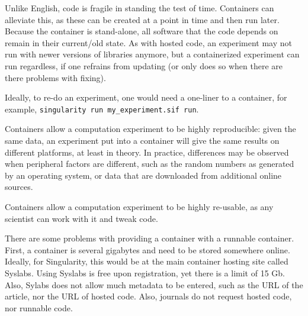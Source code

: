 
Unlike English, code is fragile in standing the test of time.
Containers can alleviate this, as these can be created at a point
in time and then run later. Because the container is stand-alone,
all software that the code depends on remain in their current/old state.
As with hosted code, an experiment may not run with newer versions
of libraries anymore, but a containerized experiment can run regardless, 
if one refrains from updating (or only does so when there are there problems with fixing).

Ideally, to re-do an experiment, one would need a one-liner to a container,
for example, \verb|singularity run my_experiment.sif run|.


Containers allow a computation experiment to be highly reproducible:
given the same data, an experiment put into a container will give
the same results on different platforms, at least in theory.
In practice, differences may be observed when peripheral factors
are different, such as the random numbers as generated by an operating
system, or data that are downloaded from additional online sources.


Containers allow a computation experiment to be highly re-usable,
as any scientist can work with it and tweak code.


There are some problems with providing a container with a runnable container.
First, a container is several gigabytes and need to be stored somewhere
online. 
Ideally, for Singularity, this would be at the main container hosting
site called Syslabs. Using Syslabs is free upon registration, 
yet there is a limit of 15 Gb. Also, Sylabs does not allow much metadata to
be entered, such as the URL of the article, nor the URL of hosted code.
Also, journals do not request hosted code, nor runnable code.

